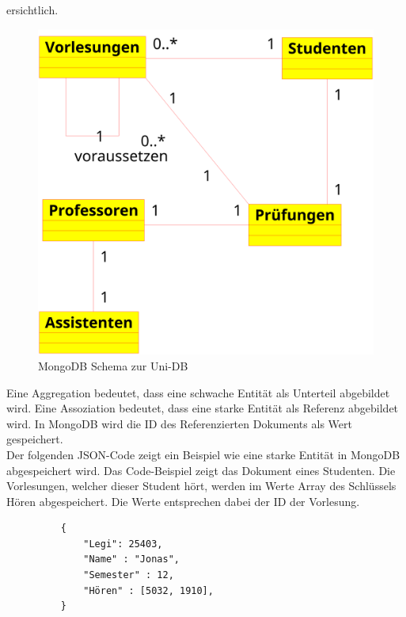 ersichtlich.
\begin{figure}[h] 
	\centering
		\includegraphics[width=1\textwidth]{./pictures/MongoDB-Schema.png}
	\caption{MongoDB Schema zur Uni-DB }
	\label{fig:uni-dbNoSQL}
\end{figure}
Eine Aggregation bedeutet, dass eine schwache Entität als Unterteil abgebildet
wird. Eine Assoziation bedeutet, dass eine starke Entität  als Referenz
abgebildet wird. In MongoDB wird die ID des Referenzierten Dokuments als Wert gespeichert.
\\
Der folgenden JSON-Code zeigt ein Beispiel wie eine starke Entität
in MongoDB abgespeichert wird. Das Code-Beispiel zeigt das Dokument eines
Studenten. Die Vorlesungen, welcher dieser Student hört, werden im Werte Array
des Schlüssels Hören abgespeichert. Die Werte entsprechen dabei der ID der
Vorlesung.
 \begin{figure} [h]
	\begin{verbatim}
	{
		"Legi": 25403,
		"Name" : "Jonas",
		"Semester" : 12,
		"Hören" : [5032, 1910],
	}
	\end{verbatim}
	\label{cod:vorlesung}
\end{figure}


